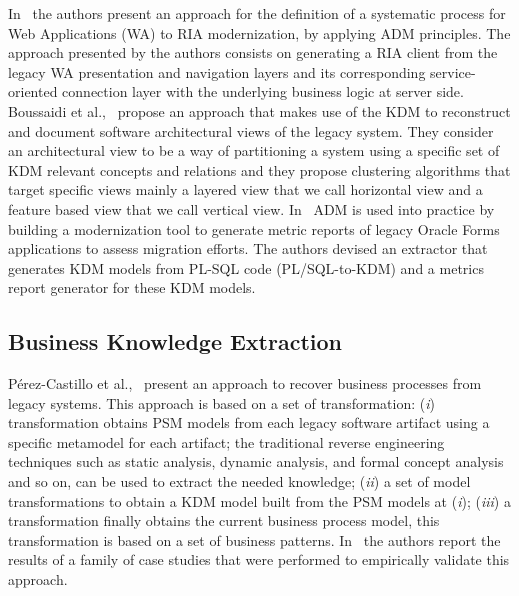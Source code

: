 In~\cite{Rodriguez-Echeverria:2011:MLW:2186508.2186536} the authors present an approach for the definition of a systematic process for Web Applications (WA) to RIA modernization, by applying ADM principles. The approach presented by the authors consists on generating a RIA client from the legacy WA presentation and navigation layers and its corresponding service-oriented connection layer with the underlying business logic at server side. Boussaidi et al.,~\cite{6385130} propose an approach that makes use of the KDM to reconstruct and document software architectural views of the legacy system. They consider an architectural view to be a way of partitioning a system using a specific set of KDM relevant concepts and relations and they propose clustering algorithms that target specific views mainly a layered view that we call horizontal view and a feature based view that we call vertical view. In~\cite{5440163} ADM is used into practice by building a modernization tool to generate metric reports of legacy Oracle Forms applications to assess migration efforts. The authors devised an extractor that generates KDM models from PL-SQL code (PL/SQL-to-KDM) and a metrics report generator for these KDM models. 

\subsection{Business Knowledge Extraction}
\label{ssub:Business_Knowledge_Extraction}

 P\'{e}rez-Castillo et al.,~\cite{Perez-Castillo:2011:ECS:1982185.1982249,6080834, 6498507,Perez-Castillo:2010:IBP:1875847.1875861} present an approach to recover business processes from legacy systems. This approach is based on a set of transformation: (\textit{i}) transformation obtains PSM models from each legacy software artifact using a specific metamodel for each artifact; the traditional reverse engineering techniques such as static analysis, dynamic analysis, and formal concept analysis and so on, can be used to extract the needed knowledge; (\textit{ii}) a set of model transformations to obtain a KDM model built from the PSM models at (\textit{i}); (\textit{iii}) a transformation finally obtains the current business process model, this transformation is based on a set of business patterns. In~\cite{PerezCastillo20121370} the authors report the results of a family of case studies that were performed to empirically validate this approach. %

